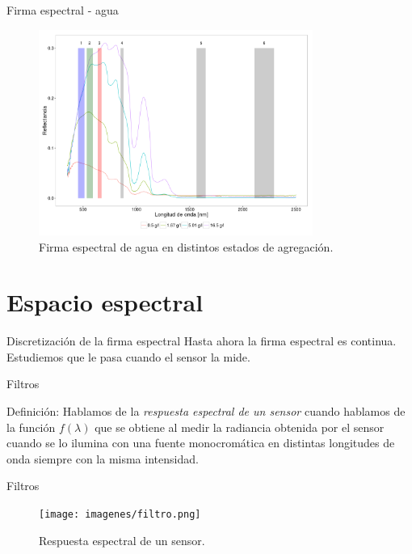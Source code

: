 \documentclass[]{beamer}
\begin{document}
\begin{frame}{Firma espectral - agua}
    \begin{figure}
    \centering
    \includegraphics[width=0.8\textwidth]{imagenes/waterm.png}
    \caption{Firma espectral de agua en distintos estados de agregación.}
    \end{figure}
\end{frame}

\section{Espacio espectral}
\begin{frame}{Discretización de la firma espectral}
  Hasta ahora la firma espectral es continua. Estudiemos que le pasa cuando el sensor la mide.
\end{frame}

\begin{frame}{Filtros}
  \begin{block}{Definición:}
    Hablamos de la \emph{respuesta espectral de un sensor} cuando hablamos de la función $f(\lambda)$ que se obtiene al medir la radiancia obtenida por el sensor cuando se lo ilumina con una fuente monocromática en distintas longitudes de onda siempre con la misma intensidad.
  \end{block}
\end{frame}

\begin{frame}{Filtros}
  \begin{figure}
    \texttt{[image: imagenes/filtro.png]}
    \caption{Respuesta espectral de un sensor.}
  \end{figure}
\end{frame}
\end{document}
